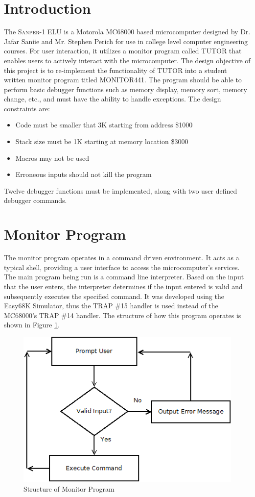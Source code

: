\documentclass[12pt]{article}
\begin{document}
	\section{Introduction}
	The \textsc{Sanper-1 ELU} is a Motorola MC68000 based microcomputer designed by Dr. Jafar Saniie and Mr. Stephen Perich for use in college level computer engineering courses\cite{manual}. For user interaction, it utilizes a monitor program called TUTOR that enables users to actively interact with the microcomputer. The design objective of this project is to re-implement the functionality of TUTOR into a student written monitor program titled MONITOR441. The program should be able to perform basic debugger functions such as memory display, memory sort, memory change, etc., and must have the ability to handle exceptions. The design constraints are:
	\begin{itemize}
		\item Code must be smaller that 3K starting from address \$1000
		\item Stack size must be 1K starting at memory location \$3000
		\item Macros may not be used
		\item Erroneous inputs should not kill the program
	\end{itemize}
	Twelve debugger functions must be implemented, along with two user defined debugger commands.
	
	\section{Monitor Program}
	The monitor program operates in a command driven environment. It acts as a typical shell, providing a user interface to access the microcomputer's services. The main program being run is a command line interpreter. Based on the input that the user enters, the interpreter determines if the input entered is valid and subsequently executes the specified command. It was developed using the Easy68K Simulator, thus the TRAP \#15 handler is used instead of the MC68000's TRAP \#14 handler. The structure of how this program operates is shown in Figure \ref{fig:monitor}.
		\begin{figure}[H]
			\centering
			\includegraphics[width=0.7\linewidth]{monitor.png}
			\caption{Structure of Monitor Program}
			\label{fig:monitor}
		\end{figure}
		
\end{document}
